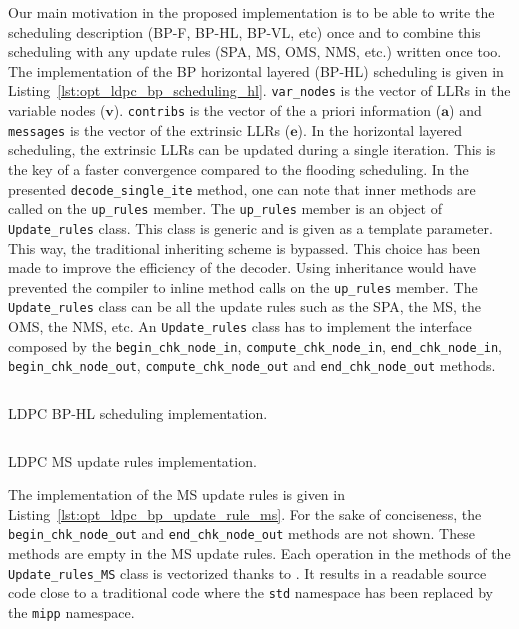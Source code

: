 Our main motivation in the proposed implementation is to be able to write the
scheduling description (BP-F, BP-HL, BP-VL, etc) once and to combine this
scheduling with any update rules (SPA, MS, OMS, NMS, etc.) written once too.
The implementation of the BP horizontal layered (BP-HL) scheduling is given in
Listing~\ref{lst:opt_ldpc_bp_scheduling_hl}. \verb|var_nodes| is the vector of
LLRs in the variable nodes ($\bm{v}$). \verb|contribs| is the vector of the a
priori information ($\bm{a}$) and \verb|messages| is the vector of the extrinsic
LLRs ($\bm{e}$). In the horizontal layered scheduling, the extrinsic LLRs can be
updated during a single iteration. This is the key of a faster convergence
compared to the flooding scheduling. In the presented \verb|decode_single_ite|
method, one can note that inner methods are called on the \verb|up_rules|
member. The \verb|up_rules| member is an object of \verb|Update_rules| class.
This class is generic and is given as a template parameter. This way, the
traditional inheriting scheme is bypassed. This choice has been made to improve
the efficiency of the decoder. Using inheritance would have prevented the
compiler to inline method calls on the \verb|up_rules| member. The
\verb|Update_rules| class can be all the update rules such as the SPA, the MS,
the OMS, the NMS, etc. An \verb|Update_rules| class has to implement the
interface composed by the \verb|begin_chk_node_in|, \verb|compute_chk_node_in|,
\verb|end_chk_node_in|, \verb|begin_chk_node_out|, \verb|compute_chk_node_out|
and \verb|end_chk_node_out| methods.

\begin{listing}[htp]
  \inputminted[frame=lines,linenos]{C++}{\curChapter/src/ldpc/bp_scheduling_hl.cpp}
  \caption{LDPC BP-HL scheduling implementation.}
  \label{lst:opt_ldpc_bp_scheduling_hl}
\end{listing}

\begin{listing}[htp]
  \inputminted[frame=lines,linenos]{C++}{\curChapter/src/ldpc/bp_update_rule_ms.cpp}
  \caption{LDPC MS update rules implementation.}
  \label{lst:opt_ldpc_bp_update_rule_ms}
\end{listing}

The implementation of the MS update rules is given in
Listing~\ref{lst:opt_ldpc_bp_update_rule_ms}. For the sake of conciseness, the
\verb|begin_chk_node_out| and \verb|end_chk_node_out| methods are not shown.
These methods are empty in the MS update rules. Each operation in the methods of
the \verb|Update_rules_MS| class is vectorized thanks to \MIPP. It results in a
readable source code close to a traditional \Cxx code where the \verb|std|
namespace has been replaced by the \verb|mipp| namespace.

